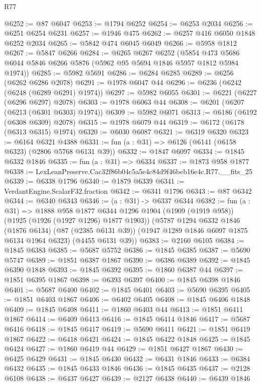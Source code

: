 \begin{lexlean}{R77}
\begin{coremodule}
@6252 := @87 @6047
@6253 := @1794 @6252
@6254 := @6253 @2034
@6256 := @6251 @6254 @6231
@6257 := @1946 @475
@6262 := @6257 @416 @6050 @1848 @6252 @2034
@6265 := @5842 @474 @6045 @6049
@6266 := @5958 @1812
@6267 := @5847 @6266
@6284 := @6265
    @6267
    @6252
    (@5854 @473 @5686 @6044 @5846 @6266 @5876 (@5962 @95 @5694 @1846 @5957 @1812 @5984 @1974))
@6285 := @5982 @5691
@6286 := @6284 @6285
@6289 := @6256 (@6262 @6286 @2078)
@6291 := @1978 @6047 @44
@6296 := @6236 (@6242 (@6248 (@6289 @6291) @1974))
@6297 := @5982 @6055
@6301 := @6221 (@6227 (@6296 @6297) @2078)
@6303 := @1978 @6063 @44
@6308 := @6201 (@6207 (@6213 (@6301 @6303) @1974))
@6309 := @5982 @6071
@6313 := @6186 (@6192 (@6308 @6309) @2078)
@6315 := @1978 @6079 @44
@6319 := @6172 (@6178 (@6313 @6315) @1974)
@6320 := @6030 @6087
@6321 := @6319 @6320
@6323 := @6164 @6321 @4388
@6331 := fun (a : @31) => @6126 (@6141 (@6158 @6323) (@2806 @5768 @6131 @39))
@6332 := @1847 @6097
@6334 := @1845 @6332 @1846
@6335 := fun (a : @31) => @6334
@6337 := @1873 @958 @1877
@6338 := LexLeanPreserve.Cac32f86b04c5a5e4c84d9f46beb16e4c.R77.__fits_25
@6339 := @6338 @1796
@6340 := @1879 @6339
@6341 := VerdantEngine.ScalarF32.fraction
@6342 := @6341 @1796
@6343 := @87 @6342
@6344 := @6340 @6343
@6346 := (a : @31) -> @6337 @6344
@6382 := fun (a : @31) =>
  @1888
    @958
    @1877
    @6344
    @1296
    @1904
    (@1909 (@1919 @958))
    (@1925 (@1926 (@1927 @1296) @1877 @1903))
    (@5787
      @1294
      @6332
      @1846
      (@1876 @6134)
      (@87 (@2385 @6131 @39))
      (@1947 @1289 @1846 @6097 @1875 @6134 @1964 @6323)
      (@4455 @6131 @39))
@6383 := @2160 @6105
@6384 := @1845 @6383
@6385 := @5687 @5752
@6386 := @1845 @6385
@6387 := @5690 @5747
@6389 := @1851 @6387 @1867
@6390 := @6386 @6389
@6392 := @1845 @6390 @1848
@6393 := @1845 @6392
@6395 := @1860 @6387 @44
@6397 := @1851 @6395 @1867
@6398 := @6393 @6397
@6400 := @1845 @6398 @1846
@6401 := @5687 @6400
@6402 := @1845 @6401
@6403 := @5690 @6395
@6405 := @1851 @6403 @1867
@6406 := @6402 @6405
@6408 := @1845 @6406 @1848
@6409 := @1845 @6408
@6411 := @1860 @6403 @44
@6413 := @1851 @6411 @1867
@6414 := @6409 @6413
@6416 := @1845 @6414 @1846
@6417 := @5687 @6416
@6418 := @1845 @6417
@6419 := @5690 @6411
@6421 := @1851 @6419 @1867
@6422 := @6418 @6421
@6424 := @1845 @6422 @1848
@6425 := @1845 @6424
@6427 := @1860 @6419 @44
@6429 := @1851 @6427 @1867
@6430 := @6425 @6429
@6431 := @1845 @6430
@6432 := @6431 @1846
@6433 := @6384 @6432
@6435 := @1845 @6433 @1846
@6436 := @1845 @6435
@6437 := @2128 @6108
@6438 := @6437 @6427
@6439 := @2127 @6438
@6440 := @6439 @1846

\end{coremodule}
\end{lexlean}
